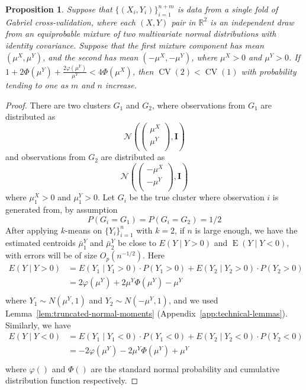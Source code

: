 \documentclass[11pt]{article}
\newtheorem{proposition}{Proposition}
\newcommand{\CV}{\operatorname{CV}}
\newcommand{\E}{\operatorname{E}}
\newcommand{\OhP}{O_p}
\newcommand{\R}{\mathbb{R}}
\newcommand{\muX}{\mu^{X}}
\newcommand{\muY}{\mu^{Y}}
\begin{document}
\begin{proposition}
Suppose that $\{(X_i,Y_i)\}_{i=1}^{n+m}$ is data from a single fold of Gabriel
cross-validation, where each $(X,Y)$ pair in $\R^2$ is an independent draw
from an equiprobable mixture of two multivariate normal distributions with
identity covariance. Suppose that the first mixture component has mean $(\muX,
\muY)$, and the second has mean $(-\muX, -\muY)$, where $\muX > 0$ and
$\muY > 0$.  If $1 + 2\Phi(\mu^Y)+ \frac{2\varphi(\mu^Y)}{\mu^Y} < 4\Phi(\mu^X)$, then $\CV(2) < \CV(1)$ with
probability tending to one as $m$ and $n$ increase.
\end{proposition}

\begin{proof}
There are two clusters $G_1$ and $G_2$, where observations from $G_1$ are distributed as
\[	\mathcal{N}\left( \begin{pmatrix} 
    \mu^X \\
    \mu^Y \\
  \end{pmatrix}, \mathbf{I} \right)	\]
and observations from $G_2$ are distributed as
\[	\mathcal{N}\left( \begin{pmatrix} 
    -\mu^X \\
    -\mu^Y \\
  \end{pmatrix}, \mathbf{I} \right)	\]
where $\mu^X_1 > 0$ and $\mu^Y_1 > 0$. Let $G_i$ be the true cluster where observation $i$ is generated from, by assumption
\[	P(G_i=G_1) = P(G_i=G_2) = 1/2	\]
After applying $k$-means on $\{ Y_i\}_{i=1}^{n}$ with $k=2$, if $n$ is large enough, we have the estimated centroids $\bar{\mu}^Y_1$ and $\bar{\mu}^Y_2$ be close to $E(Y \mid Y>0)$ and $\E(Y \mid Y < 0)$,
with errors will be of size $\OhP(n^{-1/2})$. Here
\begin{align}
E(Y \mid Y>0) &= E(Y_1 \mid Y_1 > 0) \cdot P(Y_1>0) + E(Y_2 \mid Y_2 > 0) \cdot P(Y_2>0) \nonumber \\ 
   &= 2\varphi(\mu^Y)+2\mu^Y\Phi(\mu^Y)-\mu^Y  \\  \nonumber 
\end{align}
where $Y_1 \sim N(\mu^Y, 1)$ and $Y_2 \sim N(-\mu^Y, 1)$, and we used Lemma~\ref{lem:truncated-normal-moments}
(Appendix~\ref{app:technical-lemmas}). Similarly, we have
\begin{align}
E(Y \mid Y<0) &= E(Y_1 \mid Y_1 < 0) \cdot P(Y_1<0) + E(Y_2 \mid Y_2 < 0) \cdot P(Y_2<0) \nonumber \\ 
   &= -2\varphi(\mu^Y)-2\mu^Y\Phi(\mu^Y)+\mu^Y  \\  \nonumber 
\end{align}
 where $\varphi()$ and $\Phi()$ are the standard normal probability and cumulative distribution function respectively.  



\end{proof}
\end{document}
